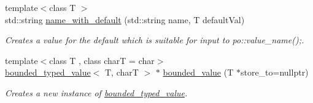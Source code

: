 \begin{DoxyCompactItemize}
{\footnotesize template$<$class T $>$ }\\std\+::string \hyperlink{group___utility_module_ga8b756cf9f42d2452f48d168883c76f4f}{name\+\_\+with\+\_\+default} (std\+::string name, T default\+Val)
\begin{DoxyCompactList}\small\item\em Creates a value for the default which is suitable for input to po\+::value\+\_\+name();. \end{DoxyCompactList}\item 
{\footnotesize template$<$class T , class charT  = char$>$ }\\\hyperlink{classboost_1_1program__options_1_1bounded__typed__value}{bounded\+\_\+typed\+\_\+value}$<$ T, charT $>$ $\ast$ \hyperlink{group___utility_module_ga29195cfb403d70365c30a76867c787b5}{bounded\+\_\+value} (T $\ast$store\+\_\+to=nullptr)
\begin{DoxyCompactList}\small\item\em Creates a new instance of \hyperlink{classboost_1_1program__options_1_1bounded__typed__value}{bounded\+\_\+typed\+\_\+value}. \end{DoxyCompactList}\end{DoxyCompactItemize}
